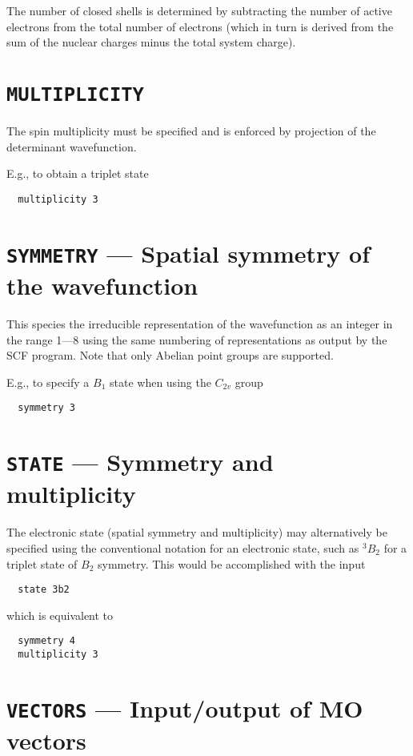 The number of closed shells is determined by subtracting the number
of active electrons from the total number of electrons (which in turn
is derived from the sum of the nuclear charges minus the total system
charge).

\section{{\tt MULTIPLICITY}}

The spin multiplicity must be specified and is enforced by projection
of the determinant wavefunction.

E.g., to obtain a triplet state
\begin{verbatim}
  multiplicity 3
\end{verbatim}

\section{{\tt SYMMETRY} --- Spatial symmetry of the wavefunction}

This species the irreducible representation of the wavefunction as an
integer in the range 1---8 using the same numbering of representations
as output by the SCF program.  Note that only Abelian point groups are
supported.

E.g., to specify a $B_1$ state when using the $C_{2v}$ group
\begin{verbatim}
  symmetry 3
\end{verbatim}

\section{{\tt STATE} --- Symmetry and multiplicity}

The electronic state (spatial symmetry and multiplicity) may
alternatively be specified using the conventional notation for an
electronic state, such as $^3B_2$ for a triplet state of $B_2$
symmetry.  This would be accomplished with the input
\begin{verbatim}
  state 3b2
\end{verbatim}
which is equivalent to 
\begin{verbatim}
  symmetry 4
  multiplicity 3
\end{verbatim}

\section{{\tt VECTORS} --- Input/output of MO vectors}
\label{sec:mcscfvectors}

